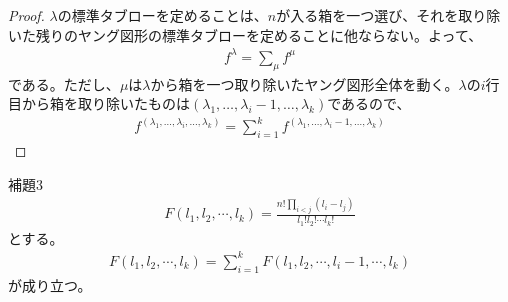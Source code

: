 \documentclass[a4paper,11pt]{jsarticle}
\theoremstyle{plain}
\theoremstyle{definition}
\renewcommand{\(}{\left(}
\renewcommand{\)}{\right)}
\renewcommand{\[}{\left[}
\renewcommand{\]}{\right]}
\renewcommand{\{}{\left\lbrace}
\renewcommand{\}}{\right\rbrace}
\begin{document}
\begin{proof}
    $\lambda$の標準タブローを定めることは、$n$が入る箱を一つ選び、それを取り除いた残りのヤング図形の標準タブローを定めることに他ならない。よって、
    \begin{align*}
        f^{\lambda} = \sum_{\mu} f^{\mu}
    \end{align*}
    である。ただし、$\mu$は$\lambda$から箱を一つ取り除いたヤング図形全体を動く。$\lambda$の$i$行目から箱を取り除いたものは$(\lambda_1, \ldots, \lambda_i - 1, \ldots, \lambda_k)$であるので、
    \begin{align*}
        f^{(\lambda_1, \ldots, \lambda_i, \ldots, \lambda_k)} = \sum_{i=1}^{k} f^{(\lambda_1, \ldots, \lambda_i - 1, \ldots, \lambda_k)}
    \end{align*}
\end{proof}

\begin{itembox}[l]{補題3}
    \begin{align*}
        F(l_1, l_2, \cdots, l_k) = \frac{n! \prod_{i<j}(l_i-l_j)}{l_1! l_2! \cdots l_k!}
    \end{align*}
    とする。
    \begin{align*}
        F(l_1, l_2, \cdots, l_k) = \sum_{i=1}^{k} F(l_1, l_2, \cdots, l_i - 1, \cdots, l_k)
    \end{align*}
    が成り立つ。
\end{itembox}
\end{document}
